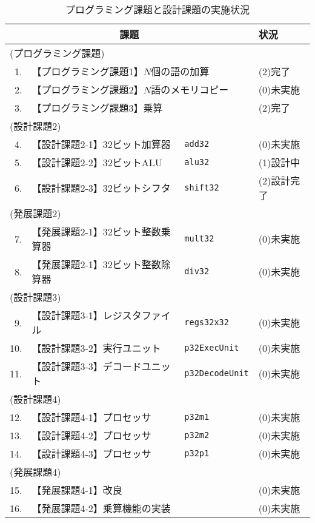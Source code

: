 \begin{table}[tb]
\caption{プログラミング課題と設計課題の実施状況}
\label{tab:プログラミング課題と設計課題の実施状況}
\begin{center}
{\small
\begin{tabular}{rll|l}
\hline
\hline
\multicolumn{3}{c|}{課題} & 状況 \\
\hline
\multicolumn{3}{l|}{(プログラミング課題)} & \\
1. & \multicolumn{2}{l|}{【プログラミング課題1】$N$個の語の加算 } & (2)完了 \\
2. & \multicolumn{2}{l|}{【プログラミング課題2】$N$語のメモリコピー} & (0)未実施 \\
3. & \multicolumn{2}{l|}{【プログラミング課題3】乗算} & (2)完了 \\
\multicolumn{3}{l|}{(設計課題2)} & \\
4. & 【設計課題2-1】32ビット加算器   & \verb|add32|          & (0)未実施 \\
5. & 【設計課題2-2】32ビットALU      & \verb|alu32|          & (1)設計中 \\
6. & 【設計課題2-3】32ビットシフタ   & \verb|shift32|        & (2)設計完了 \\
\multicolumn{3}{l|}{(発展課題2)} & \\
7. & 【発展課題2-1】32ビット整数乗算器 & \verb|mult32|       & (0)未実施 \\
8. & 【発展課題2-1】32ビット整数除算器 & \verb|div32|        & (0)未実施 \\
\multicolumn{3}{l|}{(設計課題3)} & \\
9. & 【設計課題3-1】レジスタファイル & \verb|regs32x32|      & (0)未実施 \\
10. & 【設計課題3-2】実行ユニット     & \verb|p32ExecUnit|    & (0)未実施 \\
11. & 【設計課題3-3】デコードユニット & \verb|p32DecodeUnit|  & (0)未実施 \\
\multicolumn{3}{l|}{(設計課題4)} & \\
12. & 【設計課題4-1】プロセッサ      & \verb|p32m1|          & (0)未実施 \\
13. & 【設計課題4-2】プロセッサ      & \verb|p32m2|          & (0)未実施 \\
14. & 【設計課題4-3】プロセッサ      & \verb|p32p1|          & (0)未実施 \\
\multicolumn{3}{l|}{(発展課題4)} & \\
15. & 【発展課題4-1】改良            &                       & (0)未実施 \\
16. & 【発展課題4-2】乗算機能の実装  &                       & (0)未実施 \\
\hline
\end{tabular}
}
\end{center}
\end{table}
